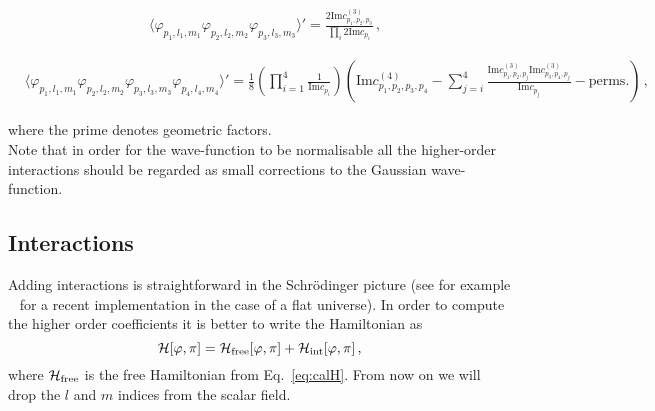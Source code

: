\documentclass[a4paper,11pt]{article}
\numberwithin{equation}{section}
\numberwithin{equation}{section}
\begin{document}
 \begin{align}
 \label{eq:3PointCF}
 &\langle\varphi_{p_1, l_1, m_1}\varphi_{p_2, l_2, m_2}\varphi_{p_3, l_3, m_3}\rangle'=\frac{2\text{Im}c^{(3)}_{p_1,p_2,p_3}}{\prod_i 2 \text{Im} c_{p_i}} \,,
 \end{align}
 \begin{footnotesize}
 \begin{align}
  \label{eq:4PointCF}
  &\langle\varphi_{p_1, l_1, m_1}\varphi_{p_2, l_2, m_2}\varphi_{p_3, l_3, m_3}\varphi_{p_4, l_4, m_4}\rangle'=\frac{1}{8}\left(\prod_{i=1}^{4}\frac{1}{\text{Im} c_{p_i}}\right)\left( \text{Im}c^{(4)}_{p_1,p_2,p_3,p_4}-\sum_{j=i}^{4}\frac{\text{Im}c^{(3)}_{p_1,p_2,p_j}\text{Im}c^{(3)}_{p_3,p_4,p_j}}{\text{Im}c_{p_j}}-\mathrm{perms.}\right) \,, \nonumber
 \end{align}
 \end{footnotesize}
where the prime denotes geometric factors.\\

Note that in order for the wave-function to be normalisable all the higher-order interactions should be regarded as small corrections to the Gaussian wave-function.

\subsection{Interactions}

Adding interactions is straightforward in the Schr\"odinger picture (see for example ~\cite{Cespedes:2020xqq} for a recent implementation in the case of a flat universe). In order to compute the higher order coefficients it is better to write the Hamiltonian as
 \begin{equation}
\mathcal{H}[\varphi, \pi] =\mathcal{ H}_{\rm{free}}[\varphi, \pi] + \mathcal{H}_{\rm{int}}[\varphi, \pi] \,,
\end{equation}
where $\mathcal{H}_{\rm{free}}$ is the free Hamiltonian from Eq.~\eqref{eq:calH}. From now on we will drop the $l$ and $m$ indices from the scalar field.
\end{document}
